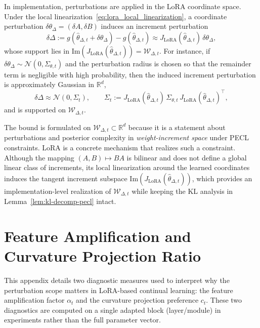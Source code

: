 \documentclass{article}
\theoremstyle{plain}
\theoremstyle{definition}
\theoremstyle{remark}
\begin{document}
In implementation, perturbations are applied in the LoRA coordinate space.
Under the local linearization~\eqref{eq:lora_local_linearization}, a coordinate perturbation
$\delta\theta_\Delta=(\delta A,\delta B)$ induces an increment perturbation
\[
\delta\Delta
:=
g(\hat\theta_{\Delta,t}+\delta\theta_\Delta)-g(\hat\theta_{\Delta,t})
\approx
J_{\mathrm{LoRA}}(\hat\theta_{\Delta,t})\,\delta\theta_\Delta,
\]
whose support lies in $\mathrm{Im}(J_{\mathrm{LoRA}}(\hat\theta_{\Delta,t}))=\mathcal W_{\Delta,t}$.
For instance, if $\delta\theta_\Delta\sim\mathcal N(0,\Sigma_{\theta,t})$ and the perturbation radius is chosen
so that the remainder term is negligible with high probability, then the induced increment perturbation is approximately Gaussian in $\mathbb R^d$,
\begin{equation}
\label{eq:Sigma_pushforward}
\delta\Delta \approx \mathcal N(0,\Sigma_t),
\qquad
\Sigma_t := J_{\mathrm{LoRA}}(\hat\theta_{\Delta,t})\,\Sigma_{\theta,t}\,
J_{\mathrm{LoRA}}(\hat\theta_{\Delta,t})^\top,
\end{equation}
and is supported on $\mathcal W_{\Delta,t}$.

The bound is formulated on $\mathcal W_{\Delta,t}\subset\mathbb R^d$ because it is a statement about perturbations
and posterior complexity in \emph{weight-increment space} under PECL constraints.
LoRA is a concrete mechanism that realizes such a constraint.
Although the mapping $(A,B)\mapsto BA$ is bilinear and does not define a global linear class of increments,
its local linearization around the learned coordinates induces the tangent increment subspace
$\mathrm{Im}(J_{\mathrm{LoRA}}(\hat\theta_{\Delta,t}))$, which provides an implementation-level realization of
$\mathcal W_{\Delta,t}$ while keeping the KL analysis in Lemma~\ref{lem:kl-decomp-pecl} intact.


\section{Feature Amplification and Curvature Projection Ratio}
\label{app:weight_projection}

This appendix details two diagnostic measures used to interpret why the perturbation scope matters in LoRA-based continual learning: the feature amplification factor $\alpha_t$ and the curvature projection preference $c_t$. 
These two diagnostics are computed on a single adapted block (layer/module) in experiments rather than the full parameter vector.
\end{document}
